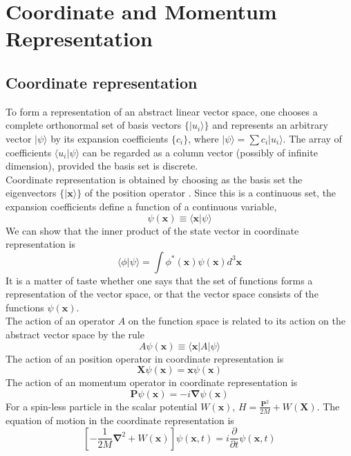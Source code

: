 \documentclass[cyan]{elegantnote}
\begin{document}
\chapter{Coordinate and Momentum Representation}
\section{Coordinate representation}
To form a representation of an abstract linear vector space, one chooses a complete orthonormal set of basis vectors $\{|u_i\rangle\}$ and represents an arbitrary vector $|\psi\rangle$ by its expansion coefficients $\{c_i\}$, where $|\psi\rangle = \sum c_i |u_i\rangle$. 
The array of coefficients $\langle u_i | \psi \rangle$ can be regarded as a column vector (possibly of infinite dimension), provided the basis set is discrete.\\
Coordinate representation is obtained by choosing as the basis set the eigenvectors $\{|\bm{x}\rangle\}$ of the position operator . Since this is a continuous set, the expansion coefficients define a function of a continuous variable,
\[\psi(\bm{x})  \equiv \langle \bm{x} | \psi \rangle\]
We can show that the inner product of the state vector in coordinate representation is
\[\langle \phi | \psi \rangle = \int \phi^{*}(\bm{x})\psi(\bm{x}) d^3\bm{x} \]
It is a matter of taste whether one says that the set of functions forms a representation of the vector space, or that the vector space consists of the functions $\psi(\bm{x})$.\\
The action of an operator $A$ on the function space is related to its action on the abstract vector space by the rule
\[A \psi(\bm{x}) \equiv  \langle \bm{x} |A| \psi \rangle\]
The action of an position operator in coordinate representation is
\[\bm{X}\psi(\bm{x}) = \bm{x} \psi(\bm{x})\]
The action of an momentum operator in coordinate representation is
\[\bm{P}\psi(\bm{x}) = -i \bm{\nabla}\psi(\bm{x})\]
For a spin-less particle in the scalar potential $W(\bm{x})$,
$H = \frac{\bm{P}^2}{2M} + W(\bm{X})$. 
The equation of motion in the coordinate representation is
\[ \left[- \frac{1}{2M} \bm{\nabla}^2 + W(\bm{x}) \right] \psi(\bm{x},t) = i\frac{\partial}{\partial t}\psi(\bm{x},t)\]
\end{document}
